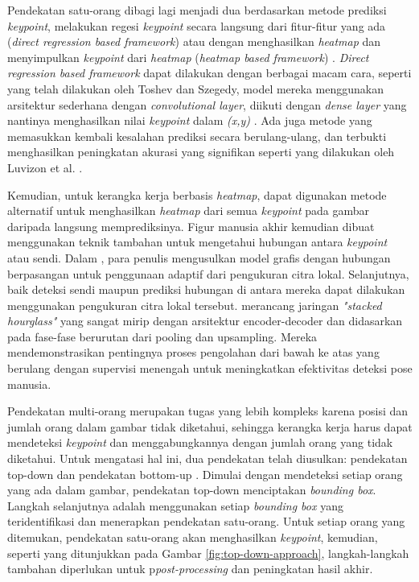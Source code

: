 Pendekatan satu-orang dibagi lagi menjadi dua berdasarkan metode prediksi \emph{keypoint}, melakukan regesi \emph{keypoint} secara langsung dari fitur-fitur yang ada (\emph{direct regression based framework}) atau dengan menghasilkan \emph{heatmap} dan menyimpulkan \emph{keypoint} dari \emph{heatmap} (\emph{heatmap based framework}) \parencite{romeo}.
\emph{Direct regression based framework} dapat dilakukan dengan berbagai macam cara, seperti yang telah dilakukan oleh Toshev dan Szegedy, model mereka menggunakan arsitektur sederhana dengan \emph{convolutional layer}, diikuti dengan \emph{dense layer} yang nantinya menghasilkan nilai \emph{keypoint} dalam \emph{(x,y)} \parencite{toshev2014}.
Ada juga metode yang memasukkan kembali kesalahan prediksi secara berulang-ulang, dan terbukti menghasilkan peningkatan akurasi yang signifikan seperti yang dilakukan oleh Luvizon et al. \parencite{carreira2015}.

Kemudian, untuk kerangka kerja berbasis \textit{heatmap}, dapat digunakan metode alternatif untuk menghasilkan \textit{heatmap} dari semua \emph{keypoint} pada gambar daripada langsung memprediksinya. Figur manusia akhir kemudian dibuat menggunakan teknik tambahan untuk mengetahui hubungan antara \emph{keypoint} atau sendi.
Dalam \parencite{chen2014}, para penulis mengusulkan model grafis dengan hubungan berpasangan untuk penggunaan adaptif dari pengukuran citra lokal. Selanjutnya, baik deteksi sendi maupun prediksi hubungan di antara mereka dapat dilakukan menggunakan pengukuran citra lokal tersebut.
\parencite{newell2016} merancang jaringan \emph{"stacked hourglass"} yang sangat mirip dengan arsitektur encoder-decoder dan didasarkan pada fase-fase berurutan dari pooling dan upsampling. Mereka mendemonstrasikan pentingnya proses pengolahan dari bawah ke atas yang berulang dengan supervisi menengah untuk meningkatkan efektivitas deteksi pose manusia.

Pendekatan multi-orang merupakan tugas yang lebih kompleks karena posisi dan jumlah orang dalam gambar tidak diketahui, sehingga kerangka kerja harus dapat mendeteksi \emph{keypoint} dan menggabungkannya dengan jumlah orang yang tidak diketahui.
Untuk mengatasi hal ini, dua pendekatan telah diusulkan: pendekatan top-down dan pendekatan bottom-up \parencite{romeo}. Dimulai dengan mendeteksi setiap orang yang ada dalam gambar, pendekatan top-down menciptakan \emph{bounding box}. Langkah selanjutnya adalah menggunakan setiap \emph{bounding box} yang teridentifikasi dan menerapkan pendekatan satu-orang.
Untuk setiap orang yang ditemukan, pendekatan satu-orang akan menghasilkan \emph{keypoint}, kemudian, seperti yang ditunjukkan pada Gambar \ref{fig:top-down-approach}, langkah-langkah tambahan diperlukan untuk p\emph{post-processing} dan peningkatan hasil akhir.

